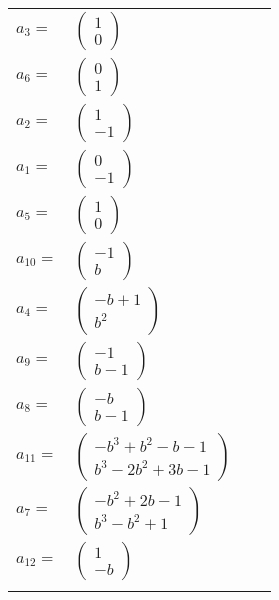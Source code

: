 \documentclass[1p]{elsarticle_modified}
\theoremstyle{definition}
\begin{document}
\begin{tabular}{m{7pt} m{180pt} m{7pt} m{180pt} }
\flushright $a_{3}=$&$\begin{pmatrix}1\\0\end{pmatrix}$ \\
\flushright $a_{6}=$&$\begin{pmatrix}0\\1\end{pmatrix}$ \\
\flushright $a_{2}=$&$\begin{pmatrix}1\\-1\end{pmatrix}$ \\
\flushright $a_{1}=$&$\begin{pmatrix}0\\-1\end{pmatrix}$ \\
\flushright $a_{5}=$&$\begin{pmatrix}1\\0\end{pmatrix}$ \\
\flushright $a_{10}=$&$\begin{pmatrix}-1\\b\end{pmatrix}$ \\
\flushright $a_{4}=$&$\begin{pmatrix}- b+1\\b^2\end{pmatrix}$ \\
\flushright $a_{9}=$&$\begin{pmatrix}-1\\b-1\end{pmatrix}$ \\
\flushright $a_{8}=$&$\begin{pmatrix}- b\\b-1\end{pmatrix}$ \\
\flushright $a_{11}=$&$\begin{pmatrix}- b^3+b^2- b-1\\b^3-2 b^2+3 b-1\end{pmatrix}$ \\
\flushright $a_{7}=$&$\begin{pmatrix}- b^2+2 b-1\\b^3- b^2+1\end{pmatrix}$ \\
\flushright $a_{12}=$&$\begin{pmatrix}1\\- b\end{pmatrix}$\\&\end{tabular}
\end{document}
